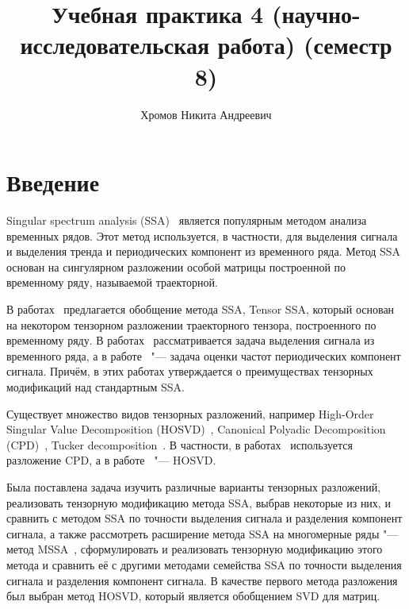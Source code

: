 \documentclass[specialist,
    substylefile = spbu_report.rtx,
    subf,href,colorlinks=true, 12pt]{disser}
\theoremstyle{plain}
\theoremstyle{definition}
\theoremstyle{remark}
\begin{document}
    \title{Учебная практика 4 (научно-исследовательская работа) (семестр 8)}
    \author{Хромов Никита Андреевич}
    \date{\number\year}
    \maketitle

    \tableofcontents


    \section{Введение}\label{sec:intro}
    Singular spectrum analysis (SSA)~\cite{ssa} является популярным методом анализа временных рядов.
    Этот метод используется, в частности, для выделения сигнала и выделения тренда и периодических компонент из временного ряда.
    Метод SSA основан на сингулярном разложении особой матрицы построенной по временному ряду, называемой траекторной.

    В работах~\cite{TSSA, TSSA-improved, hosvd-hooi-separation} предлагается обобщение метода SSA, Tensor SSA, который основан на некотором
    тензорном разложении траекторного тензора, построенного по временному ряду.
    В работах~\cite{TSSA, TSSA-improved} рассматривается задача выделения сигнала из временного ряда,
    а в работе~\cite{hosvd-hooi-separation} "--- задача оценки частот периодических компонент сигнала.
    Причём, в этих работах утверждается о преимуществах тензорных модификаций над стандартным SSA\@.

    Существует множество видов тензорных разложений, например High-Order Singular Value Decomposition (HOSVD)~\cite{hosvd},
    Canonical Polyadic Decomposition (CPD)~\cite{parafac1, parafac2}, Tucker decomposition~\cite{tucker}.
    В частности, в работах~\cite{TSSA, TSSA-improved} используется разложение CPD, а в
    работе~\cite{hosvd-hooi-separation} "--- HOSVD\@.

    Была поставлена задача изучить различные варианты тензорных разложений, реализовать тензорную модификацию
    метода SSA, выбрав некоторые из них,
    и сравнить с методом SSA по точности выделения сигнала и разделения компонент сигнала, а также
    рассмотреть расширение метода SSA на многомерные ряды "--- метод MSSA~\cite{ssa-2020},
    сформулировать и реализовать тензорную модификацию этого метода и сравнить её с другими методами
    семейства SSA по точности выделения сигнала и разделения компонент сигнала.
    В качестве первого метода разложения был выбран метод HOSVD, который является обобщением SVD для матриц.
\end{document}
